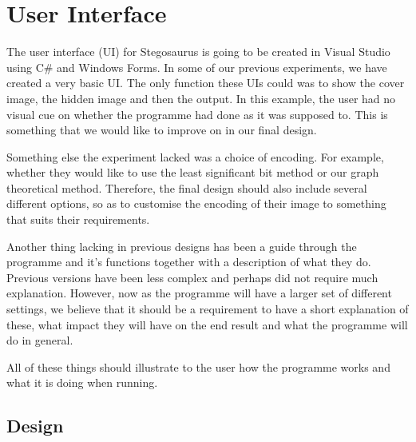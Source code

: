 \section{User Interface}

The user interface (UI) for Stegosaurus is going to be created in Visual Studio using C\# and Windows Forms.
In some of our previous experiments, we have created a very basic UI. 
The only function these UIs could was to show the cover image, the hidden image and then the output.
In this example, the user had no visual cue on whether the programme had done as it was supposed to.
This is something that we would like to improve on in our final design.

Something else the experiment lacked was a choice of encoding. 
For example, whether they would like to use the least significant bit method or our graph theoretical method.
Therefore, the final design should also include several different options, so as to customise the encoding of their image to something that suits their requirements. 

Another thing lacking in previous designs has been a guide through the programme and it's functions together with a description of what they do.
Previous versions have been less complex and perhaps did not require much explanation. However, now as the programme will have a larger set of different settings, we believe that it should be a requirement to have a short explanation of these, what impact they will have on the end result and what the programme will do in general.

All of these things should illustrate to the user how the programme works and what it is doing when running.

\subsection{Design}

